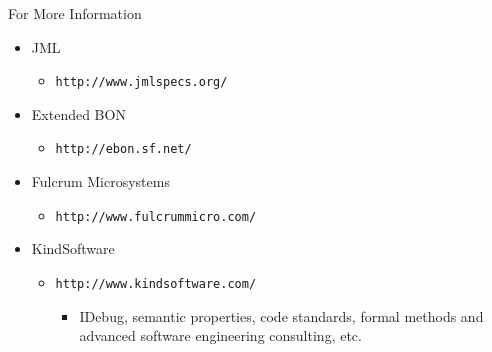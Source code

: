 \documentclass[%
final,
slideColor,
nototal,
nocolorBG,
pdf,
accumulate,
next,
]{prosper}
\begin{document}
\begin{slide}{For More Information}
  \begin{itemize}
  \item JML
    \begin{itemize}
    \item \texttt{http://www.jmlspecs.org/}
    \end{itemize}
  \item Extended BON
    \begin{itemize}
    \item \texttt{http://ebon.sf.net/}
    \end{itemize}
  \item Fulcrum Microsystems
    \begin{itemize}
    \item \texttt{http://www.fulcrummicro.com/}
    \end{itemize}
  \item KindSoftware
    \begin{itemize}
    \item \texttt{http://www.kindsoftware.com/}
      \begin{itemize}
      \item IDebug, semantic properties, code standards, formal methods and
      advanced software engineering consulting, etc.
      \end{itemize}
    \end{itemize}
  \end{itemize}
\end{slide}



\end{document}
